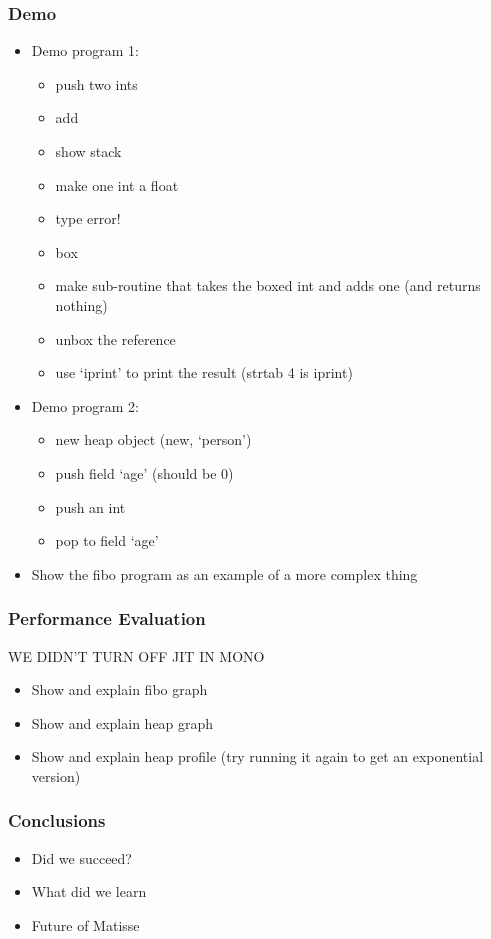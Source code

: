 \documentclass[handout]{beamer}
\begin{document}
\begin{frame}
  \frametitle{Demo}

  \begin{itemize}
  \item Demo program 1:
    \begin{itemize}
    \item push two ints
    \item add
    \item show stack
    \item make one int a float
    \item type error!
    \item box
    \item make sub-routine that takes the boxed int and adds one (and returns nothing)
    \item unbox the reference
    \item use `iprint' to print the result (strtab 4 is iprint)
    \end{itemize}

  \item Demo program 2:
    \begin{itemize}
    \item new heap object (new, `person')
    \item push field `age' (should be 0)
    \item push an int
    \item pop to field `age'
    \end{itemize}

  \item Show the fibo program as an example of a more complex thing
  \end{itemize}
\end{frame}

\begin{frame}
  \frametitle{Performance Evaluation}

  WE DIDN'T TURN OFF JIT IN MONO

  \begin{itemize}
    \item Show and explain fibo graph
    \item Show and explain heap graph
    \item Show and explain heap profile (try running it again to get an exponential version)
  \end{itemize}
\end{frame}

\begin{frame}
  \frametitle{Conclusions}

  \begin{itemize}
  \item Did we succeed?
  \item What did we learn
  \item Future of Matisse
  \end{itemize}
\end{frame}
\end{document}
